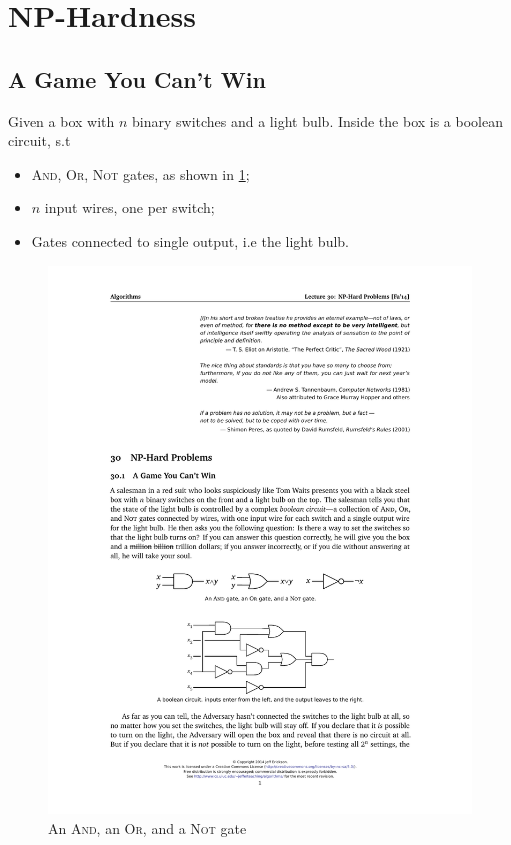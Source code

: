 \section{NP-Hardness}

\subsection{A Game You Can't Win}
Given a box with $n$ binary switches and a light bulb.
Inside the box is a boolean circuit, s.t
\begin{itemize}
    \item \textsc{And}, \textsc{Or}, \textsc{Not} gates, as shown in \cref{fig:gates};
    \item $n$ input wires, one per switch;
    \item Gates connected to single output, i.e the light bulb.
\end{itemize}
\begin{figure}[H]
    \centering
    \includegraphics{fig/gates}
    \caption{An \textsc{And}, an \textsc{Or}, and a \textsc{Not} gate}
    \label{fig:gates}
\end{figure}
